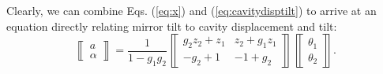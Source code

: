 Clearly, we can combine Eqs. (\ref{eq:x}) and
(\ref{eq:cavitydisptilt}) to arrive at an equation directly relating
mirror tilt to cavity displacement and tilt: 
\begin{equation}
\left\llbracket \begin{array}{c}
a \\
\alpha \end{array} \right\rrbracket = \frac{1}{1-g_1g_2}
\left\llbracket \begin{array}{cc}
g_2z_2 + z_1 & z_2 + g_1z_1\\
-g_2 + 1 & -1 + g_2\end{array} \right\rrbracket
\left\llbracket \begin{array}{c}
\theta_1\\
\theta_2 \end{array} \right\rrbracket.
\label{eq:cavitydisptilt_mirrorangle}
\end{equation}